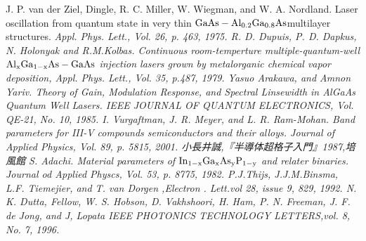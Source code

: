 \begin{thebibliography}{99}
 J. P. van der Ziel, Dingle, R. C. Miller, W. Wiegman, and W. A. Nordland. Laser oscillation from quantum state in very thin $\rm{GaAs-Al_{0.2}Ga_{0.8}As }$multilayer structures. \sl Appl. Phys. Lett.\rm , Vol. 26,  p. 463, 1975. 
 R. D. Dupuis, P. D. Dapkus, N. Holonyak and R.M.Kolbas. Continuous room-temperture multiple-quantum-well $\rm{Al_{x}Ga_{1-x}As-GaAs}$ injection lasers grown by metalorganic chemical vapor deposition, \sl  Appl. Phys. Lett.\rm , Vol. 35, p.487, 1979.
 Yasuo Arakawa, and Amnon Yariv. Theory of Gain, Modulation Response, and Spectral Linsewidth in AlGaAs Quantum Well Lasers. \sl IEEE JOURNAL OF QUANTUM ELECTRONICS\rm , Vol. QE-21, No. 10, 1985.
 I. Vurgaftman, J. R. Meyer, and L. R. Ram-Mohan. Band parameters for III-V compounds semiconductors and their alloys. \sl Journal of Applied Physics\rm , Vol. 89, p. 5815, 2001.
小長井誠,『半導体超格子入門』1987,培風館
 S. Adachi. Material parameters of $\rm{In_{1-x}Ga_{x}As_{y}P_{1-y}}$ and relater binaries. \sl Journal od Applied Physcs\rm , Vol. 53, p. 8775, 1982.
 P.J.Thijs, J.J.M.Binsma, L.F. Tiemejier, and T. van Dorgen ,\sl Electron . Lett.\rm vol 28, issue 9, 829, 1992.
N. K. Dutta, Fellow, W. S. Hobson, D. Vakhshoori, H. Ham, P. N. Freeman, J. F. de Jong, and J, Lopata \sl IEEE PHOTONICS TECHNOLOGY LETTERS\rm ,vol. 8, No. 7,  1996.











\end{thebibliography}
